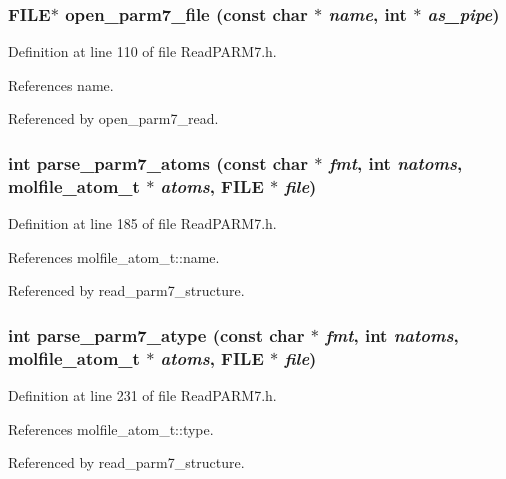 \subsubsection{\setlength{\rightskip}{0pt plus 5cm}FILE$\ast$ open\_\-parm7\_\-file (const char $\ast$ {\em name}, int $\ast$ {\em as\_\-pipe})\hspace{0.3cm}{\tt  [static]}}\label{ReadPARM7_8h_a5}




Definition at line 110 of file Read\-PARM7.h.

References name.

Referenced by open\_\-parm7\_\-read.
\subsubsection{\setlength{\rightskip}{0pt plus 5cm}int parse\_\-parm7\_\-atoms (const char $\ast$ {\em fmt}, int {\em natoms}, {\bf molfile\_\-atom\_\-t} $\ast$ {\em atoms}, FILE $\ast$ {\em file})\hspace{0.3cm}{\tt  [static]}}\label{ReadPARM7_8h_a6}




Definition at line 185 of file Read\-PARM7.h.

References molfile\_\-atom\_\-t::name.

Referenced by read\_\-parm7\_\-structure.
\subsubsection{\setlength{\rightskip}{0pt plus 5cm}int parse\_\-parm7\_\-atype (const char $\ast$ {\em fmt}, int {\em natoms}, {\bf molfile\_\-atom\_\-t} $\ast$ {\em atoms}, FILE $\ast$ {\em file})\hspace{0.3cm}{\tt  [static]}}\label{ReadPARM7_8h_a9}




Definition at line 231 of file Read\-PARM7.h.

References molfile\_\-atom\_\-t::type.

Referenced by read\_\-parm7\_\-structure.
